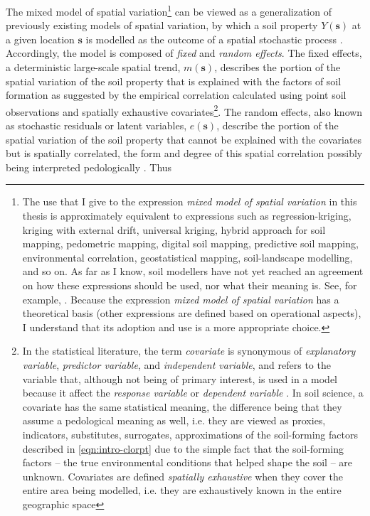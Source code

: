 The mixed model of spatial variation\footnote{The use that I give to the expression \emph{mixed model of 
spatial variation}
in this thesis is approximately equivalent to expressions such as regression-kriging, kriging with external 
drift, universal
kriging, hybrid approach for soil mapping, pedometric mapping, digital soil mapping, predictive soil mapping, 
environmental
correlation, geostatistical mapping, soil-landscape modelling, and so on. As far as I know, soil modellers have 
not yet reached an agreement on how these  expressions should be used, nor what their 
 meaning is. See, for example, . Because the 
expression \emph{mixed model of spatial variation} has a theoretical basis (other expressions are defined based 
on operational aspects), I understand that its adoption and use is a more appropriate choice.} can be viewed as 
a generalization of previously existing models of spatial variation, by which a soil property 
$Y(\boldsymbol{s})$ at a given location $\boldsymbol{s}$ is modelled as the outcome of a spatial stochastic 
process \cite{Cressie1993, HeuvelinkEtAl2001, LarkEtAl2006}. Accordingly, the model is composed of \emph{fixed} 
and \emph{random effects}. The fixed effects, a deterministic large-scale spatial trend, $m(\boldsymbol{s})$, 
describes the portion of the spatial variation of the soil property that is explained with the factors of soil 
formation as suggested by the empirical correlation calculated using point soil observations and spatially 
exhaustive covariates\footnote{In the statistical literature, the term \emph{covariate} is synonymous of 
\emph{explanatory variable}, \emph{predictor variable}, and \emph{independent variable}, and refers to the 
variable that, although not being of primary interest, is used in a model because it affect the \emph{response 
variable} or \emph{dependent variable} \cite{Everitt2006}. In soil science, a covariate has the same 
statistical meaning, the difference being that they assume a pedological meaning as well, i.e. they are viewed 
as proxies, indicators, substitutes, surrogates, approximations of the soil-forming factors described in 
\autoref{eqn:intro-clorpt} due to the simple fact that the soil-forming factors -- the true environmental 
conditions that helped shape the soil -- are unknown. Covariates are defined \emph{spatially exhaustive} when 
they cover the entire area being modelled, i.e. they are exhaustively known in the entire geographic space}. 
The random effects, also known as stochastic residuals or latent variables, $e(\boldsymbol{s})$, describe the 
portion of the spatial variation of the soil property that cannot be explained with the covariates but is 
spatially correlated, the form and degree of this spatial correlation possibly being interpreted pedologically 
\cite{Lark2012}. Thus

